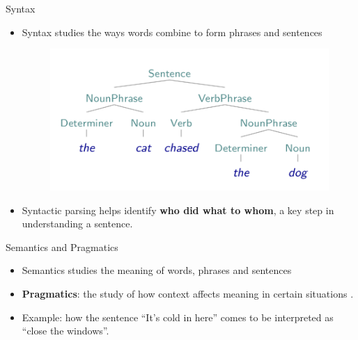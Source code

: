 \documentclass[handout]{beamer}
\begin{document}
\begin{frame}{Syntax}
\scriptsize{
\begin{itemize}
\item Syntax studies the ways words combine to form phrases and sentences \cite{JohnsonMLSS}
     \begin{figure}[h]
        	\includegraphics[scale = 0.3]{pics/parseTree1.png}
        \end{figure}
\item Syntactic parsing helps identify \textbf{who did what to whom}, a key step in
understanding a sentence.       
\end{itemize}

}


\end{frame}


\begin{frame}{Semantics and Pragmatics}
\scriptsize{
\begin{itemize}
\item Semantics studies the meaning of words, phrases and sentences \cite{JohnsonMLSS}


\item \textbf{Pragmatics}: the study of how context affects meaning in certain situations \cite{fromkin2018introduction}.
\item Example: how the sentence ``It’s cold in here'' comes to be interpreted as ``close the windows''.

\end{itemize}

}


\end{frame}
\end{document}
